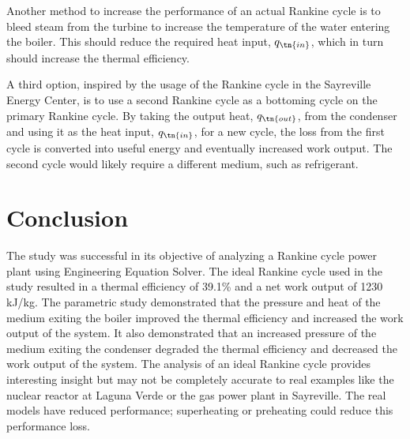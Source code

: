 \documentclass[12pt, letterpaper]{article}
\begin{document}
Another method to increase the performance of an actual Rankine cycle is to bleed steam from the turbine to increase the temperature of the water entering the boiler. This should reduce the required heat input, $q_{\tn{in}}$, which in turn should increase the thermal efficiency.

A third option, inspired by the usage of the Rankine cycle in the Sayreville Energy Center, is to use a second Rankine cycle as a bottoming cycle on the primary Rankine cycle. By taking the output heat, $q_{\tn{out}}$, from the condenser and using it as the heat input, $q_{\tn{in}}$, for a new cycle, the loss from the first cycle is converted into useful energy and eventually increased work output. The second cycle would likely require a different medium, such as refrigerant.

\section{Conclusion}

The study was successful in its objective of analyzing a Rankine cycle power plant using Engineering Equation Solver. The ideal Rankine cycle used in the study resulted in a thermal efficiency of 39.1\% and a net work output of 1230 kJ/kg. The parametric study demonstrated that the pressure and heat of the medium exiting the boiler improved the thermal efficiency and increased the work output of the system. It also demonstrated that an increased pressure of the medium exiting the condenser degraded the thermal efficiency and decreased the work output of the system. The analysis of an ideal Rankine cycle provides interesting insight but may not be completely accurate to real examples like the nuclear reactor at Laguna Verde or the gas power plant in Sayreville. The real models have reduced performance; superheating or preheating could reduce this performance loss.

\newpage

 
 
\end{document}
